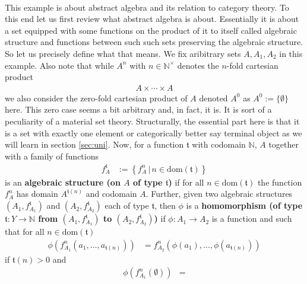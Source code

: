 \\
\begin{exa}
\label{exa:algstruct1}
This example is about abstract algebra and its relation to category theory. To this end let us first review what abstract algebra is about. Essentially it is about a set equipped with some functions on the product of it to itself called algebraic structure and functions between such such sets preserving the algebraic structure. So let us precisely define what that means. We fix aribitrary sets $A,A_{1},A_{2}$ in this example. Also note that while $A^{n}$ with $n \in \mathbb{N}^{\times}$ denotes the $n$-fold cartesian product
\begin{align*}
  A
  \times
  \cdots
  \times
  A
\end{align*}
we also consider the zero-fold cartesian product of $A$ denoted $A^{0}$ as $A^{0} := \lbrace \emptyset \rbrace$ here. This zero case seems a bit arbitrary and, in fact, it is. It is sort of a peculiarity of a material set theory. Structurally, the essential part here is that it is a set with exactly one element or categorically better say terminal object as we will learn in section \ref{sec:uni}. Now, for a function $\mathfrak{t}$ with codomain $\mathbb{N}$, $A$ together with a family of functions
\begin{align*}
  f_{A}^{\mathfrak{t}}
  &:=
  \left\lbrace
      f_{A}^{n}
    \,
    \vert
    \,
      n
      \in
      \mathrm{dom}(\mathfrak{t})
  \right\rbrace
\end{align*}
is an \textbf{algebraic structure (on $A$ of type $\mathfrak{t}$)} if for all $n \in \mathrm{dom}(\mathfrak{t})$ the function $f_{A}^{n}$ has domain $A^{\mathfrak{t}(n)}$ and codomain $A$. Further, given two algebraic structures $(A_{1},f_{A_{1}}^{\mathfrak{t}})$ and $(A_{2},f_{A_{2}}^{\mathfrak{t}})$ each of type $\mathfrak{t}$, then $\phi$ is a \textbf{homomorphism (of type $\mathfrak{t} \colon Y \rightarrow \mathbb{N}$ from $(A_{1},f_{A_{1}}^{\mathfrak{t}})$ to $(A_{2},f_{A_{2}}^{\mathfrak{t}})$)} if $\phi \colon A_{1} \rightarrow A_{2}$ is a function and such that for all $n \in \mathrm{dom}(\mathfrak{t})$
\begin{align*}
  \phi
  \left(
    f_{A_{1}}^{n}(a_{1},\ldots,a_{\mathfrak{t}(n)})
  \right)
  &=
  f_{A_{2}}^{n}
  \left(
    \phi(a_{1}),
    \ldots,
    \phi(a_{\mathfrak{t}(n)})
  \right)
\end{align*}
if $\mathfrak{t}(n) > 0$ and
\begin{align*}
  \phi
  \left(
    f_{A_{1}}^{n}(\emptyset)
  \right)
  &=

\end{align*}
\end{exa}
